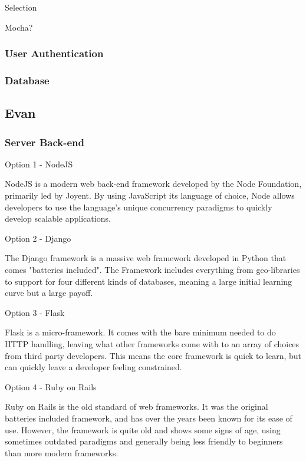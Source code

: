 \documentclass[letterpaper, 10pt, draftclsnofoot, compsoc, onecolumn]{IEEEtran}
\begin{document}
{\medskip
{\noindent Selection \par}
{\noindent Mocha? \par}




\newpage

\medskip

\newpage
\subsubsection{User Authentication}
{\noindent \par}

\medskip

\newpage
\subsubsection{Database}
{\noindent \par}

\medskip


\newpage
\subsection{Evan}
\vspace{1pc}
\subsubsection{Server Back-end}
{\noindent Option 1 - NodeJS \par}
{\noindent NodeJS is a modern web back-end framework developed by the Node Foundation,
primarily led by Joyent. By using JavaScript its language of choice, Node allows
developers to use the language's unique concurrency paradigms to quickly develop
scalable applications. \par}
{\noindent Option 2 - Django \par}
{\noindent The Django framework is a massive web framework developed in Python that comes "batteries
included". The Framework includes everything from geo-libraries to support for four different kinds of
databases, meaning a large initial learning curve but a large payoff. \par}
{\noindent Option 3 - Flask \par}
{\noindent Flask is a micro-framework. It comes with the bare minimum needed to do HTTP handling, leaving
what other frameworks come with to an array of choices from third party developers. This means the core
framework is quick to learn, but can quickly leave a developer feeling constrained. \par}
{\noindent Option 4 - Ruby on Rails \par}
{\noindent Ruby on Rails is the old standard of web frameworks. It was the original batteries included
framework, and has over the years been known for its ease of use. However, the framework is quite old
and shows some signs of age, using sometimes outdated paradigms and generally being less friendly to beginners
than more modern frameworks. \par}

}
\end{document}
